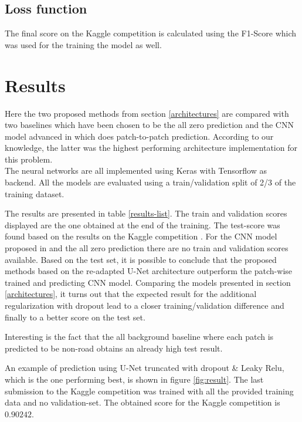 \documentclass[10pt,conference,compsocconf]{IEEEtran}
\begin{document}
\subsection{Loss function}

The final score on the Kaggle competition \cite{KaggleCompetition} is calculated using the F1-Score which was used for the training the model as well.

\section{Results}

Here the two proposed methods from section \ref{architectures} are compared with two baselines which have been chosen to be the all zero prediction and the CNN model advanced in \cite{Pavllo2017} which does patch-to-patch prediction. According to our knowledge, the latter was the highest performing architecture implementation for this problem. \\
The neural networks are all implemented using Keras with Tensorflow as backend. All the models are evaluated using a train/validation split of 2/3 of the training dataset.

The results are presented in table \ref{results-list}. The train and validation scores displayed are the one obtained at the end of the training. The test-score was found based on the results on the Kaggle competition \cite{KaggleCompetition}. For the CNN model proposed in \cite{Pavllo2017} and the all zero prediction there are no train and validation scores available. Based on the test set, it is possible to conclude that the proposed methods based on the re-adapted U-Net architecture outperform the patch-wise trained and predicting CNN model. Comparing the models presented in section \ref{architectures}, it turns out that the expected result for the additional regularization with dropout lead to a closer training/validation difference and finally to a better score on the test set.

Interesting is the fact that the all background baseline where each patch is predicted to be non-road obtains an already high test result.

An example of prediction using U-Net truncated with dropout \& Leaky Relu, which is the one performing best, is shown in figure \ref{fig:result}. The last submission to the Kaggle competition was trained with all the provided training data and no validation-set. The obtained score for the Kaggle competition is $0.90242$.
\end{document}
